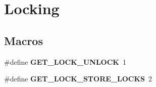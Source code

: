 \hypertarget{group__Locking}{}\section{Locking}
\label{group__Locking}
\subsection*{Macros}
\begin{DoxyCompactItemize}
\item 
\mbox{\label{group__Locking_ga65cffe586bef8fdfb5334d343c069df6}} 
\#define {\bfseries G\+E\+T\+\_\+\+L\+O\+C\+K\+\_\+\+U\+N\+L\+O\+CK}~1
\item 
\mbox{\label{group__Locking_ga1bef164e121fc9d85a6e19eae9625365}} 
\#define {\bfseries G\+E\+T\+\_\+\+L\+O\+C\+K\+\_\+\+S\+T\+O\+R\+E\+\_\+\+L\+O\+C\+KS}~2
\end{DoxyCompactItemize}
